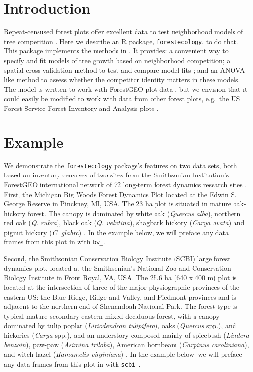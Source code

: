 \documentclass[12pt]{article}
\begin{document}
\hypertarget{introduction}{%
\section{Introduction}\label{introduction}}

Repeat-censused forest plots offer excellent data to test neighborhood
models of tree competition \citet{allen_permutation_2020}
\citet{canham_neighborhood_2006} \citet{uriarte_spatially_2004}. Here we
describe an R package, \texttt{forestecology}, to do that. This package
implements the methods in \citet{allen_permutation_2020}. It provides: a
convenient way to specify and fit models of tree growth based on
neighborhood competition; a spatial cross validation method to test and
compare model fits \citet{roberts_cross-validation_2017}; and an
ANOVA-like method to assess whether the competitor identity matters in
these models. The model is written to work with ForestGEO plot data
\citet{andersonteixeira_ctfs-forestgeo_2015}, but we envision that it
could easily be modified to work with data from other forest plots,
e.g.~the US Forest Service Forest Inventory and Analysis plots
\citet{smith_forest_2002}.

\hypertarget{example}{%
\section{Example}\label{example}}

We demonstrate the \texttt{forestecology} package's features on two data
sets, both based on inventory censuses of two sites from the Smithsonian
Institution's ForestGEO international network of 72 long‐term forest
dynamics research sites \citet{andersonteixeira_ctfs-forestgeo_2015}.
First, the Michigan Big Woods Forest Dynamics Plot located at the Edwin
S. George Reserve in Pinckney, MI, USA. The 23 ha plot is situated in
mature oak-hickory forest. The canopy is dominated by white oak
(\emph{Quercus alba}), northern red oak (\emph{Q. rubra}), black oak
(\emph{Q. velutina}), shagbark hickory (\emph{Carya ovata}) and pignut
hickory (\emph{C. glabra}) \citet{allen_michigan_2020}. In the example
below, we will preface any data frames from this plot in with
\texttt{bw\_}.

Second, the Smithsonian Conservation Biology Institute (SCBI) large
forest dynamics plot, located at the Smithsonian's National Zoo and
Conservation Biology Institute in Front Royal, VA, USA. The 25.6 ha (640
x 400 m) plot is located at the intersection of three of the major
physiographic provinces of the eastern US: the Blue Ridge, Ridge and
Valley, and Piedmont provinces and is adjacent to the northern end of
Shenandoah National Park. The forest type is typical mature secondary
eastern mixed deciduous forest, with a canopy dominated by tulip poplar
(\emph{Liriodendron tulipifera}), oaks (\emph{Quercus} spp.), and
hickories (\emph{Carya} spp.), and an understory composed mainly of
spicebush (\emph{Lindera benzoin}), paw-paw (\emph{Asimina triloba}),
American hornbeam (\emph{Carpinus caroliniana}), and witch hazel
(\emph{Hamamelis virginiana}) \citet{bourg_initial_2013}. In the example
below, we will preface any data frames from this plot in with
\texttt{scbi\_}.
\end{document}
